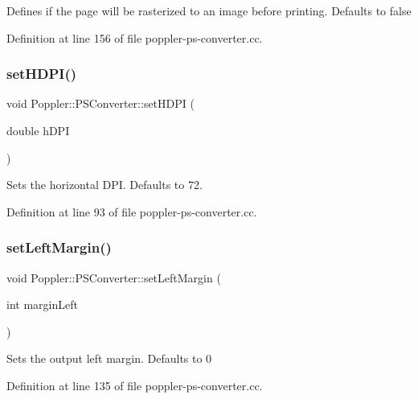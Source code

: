Defines if the page will be rasterized to an image before printing. Defaults to false 

Definition at line 156 of file poppler-\/ps-\/converter.\+cc.

\mbox{\label{class_poppler_1_1_p_s_converter_ad91c3171f4d97e7fc43bb06edc4fb9b1}} 
\subsubsection{\texorpdfstring{set\+H\+D\+P\+I()}{setHDPI()}}
{\footnotesize\ttfamily void Poppler\+::\+P\+S\+Converter\+::set\+H\+D\+PI (\begin{DoxyParamCaption}\item[{double}]{h\+D\+PI }\end{DoxyParamCaption})}

Sets the horizontal D\+PI. Defaults to 72. 

Definition at line 93 of file poppler-\/ps-\/converter.\+cc.

\mbox{\label{class_poppler_1_1_p_s_converter_a8062eaac0b2cfdc4930c6f39593abc9a}} 
\subsubsection{\texorpdfstring{set\+Left\+Margin()}{setLeftMargin()}}
{\footnotesize\ttfamily void Poppler\+::\+P\+S\+Converter\+::set\+Left\+Margin (\begin{DoxyParamCaption}\item[{int}]{margin\+Left }\end{DoxyParamCaption})}

Sets the output left margin. Defaults to 0 

Definition at line 135 of file poppler-\/ps-\/converter.\+cc.

\mbox{\label{class_poppler_1_1_p_s_converter_a3cdcdc3ed5cebb1f69e80c66d08b5948}} 

